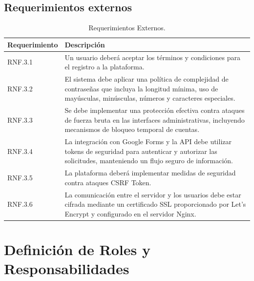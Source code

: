 \subsection{Requerimientos externos}

\begin{table}[H]
    \centering
    \begin{tabular}{|l|p{10cm}|}
        \hline
        \textbf{Requerimiento} & \textbf{Descripción} \\
        \hline
        RNF.3.1 & Un usuario deberá aceptar los términos y condiciones para el registro a la plataforma. \\
        \hline
        RNF.3.2 & El sistema debe aplicar una política de complejidad de contraseñas que incluya la longitud mínima, uso de mayúsculas, minúsculas, números y caracteres especiales. \\
        \hline
        RNF.3.3 & Se debe implementar una protección efectiva contra ataques de fuerza bruta en las interfaces administrativas, incluyendo mecanismos de bloqueo temporal de cuentas. \\
        \hline
        RNF.3.4 & La integración con Google Forms y la API debe utilizar tokens de seguridad para autenticar y autorizar las solicitudes, manteniendo un flujo seguro de información. \\
        \hline
        RNF.3.5 & La plataforma deberá implementar medidas de seguridad contra ataques CSRF Token. \\
        \hline
        RNF.3.6 & La comunicación entre el servidor y los usuarios debe estar cifrada mediante un certificado SSL proporcionado por Let's Encrypt y configurado en el servidor Nginx. \\
        \hline
    \end{tabular}
    \caption{Requerimientos Externos.}
    \label{tab:rnf-externos}
\end{table}


\section{Definición de Roles y Responsabilidades}

